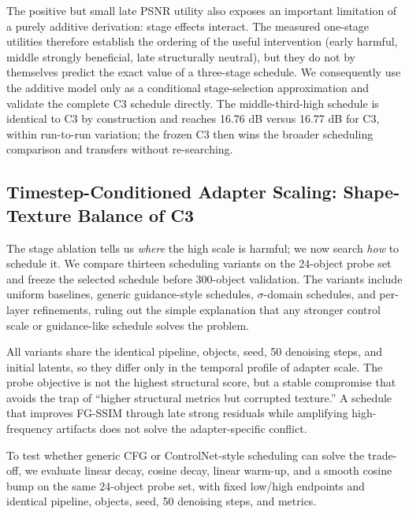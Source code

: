 \documentclass[times,twocolumn,final]{elsarticle}
\begin{document}
The positive but small late PSNR utility also exposes an important limitation of a purely additive derivation: stage effects interact. The measured one-stage utilities therefore establish the ordering of the useful intervention (early harmful, middle strongly beneficial, late structurally neutral), but they do not by themselves predict the exact value of a three-stage schedule. We consequently use the additive model only as a conditional stage-selection approximation and validate the complete C3 schedule directly. The middle-third-high schedule is identical to C3 by construction and reaches 16.76 dB versus 16.77 dB for C3, within run-to-run variation; the frozen C3 then wins the broader scheduling comparison and transfers without re-searching.

\subsection{Timestep-Conditioned Adapter Scaling: Shape-Texture Balance of C3}
\label{subsec:c3}

The stage ablation tells us \emph{where} the high scale is harmful; we now search \emph{how} to schedule it. We compare thirteen scheduling variants on the 24-object probe set and freeze the selected schedule before 300-object validation. The variants include uniform baselines, generic guidance-style schedules, $\sigma$-domain schedules, and per-layer refinements, ruling out the simple explanation that any stronger control scale or guidance-like schedule solves the problem.

All variants share the identical pipeline, objects, seed, 50 denoising steps, and initial latents, so they differ only in the temporal profile of adapter scale. The probe objective is not the highest structural score, but a stable compromise that avoids the trap of ``higher structural metrics but corrupted texture.'' A schedule that improves FG-SSIM through late strong residuals while amplifying high-frequency artifacts does not solve the adapter-specific conflict.

To test whether generic CFG or ControlNet-style scheduling can solve the trade-off, we evaluate linear decay, cosine decay, linear warm-up, and a smooth cosine bump on the same 24-object probe set, with fixed low/high endpoints and identical pipeline, objects, seed, 50 denoising steps, and metrics.
\end{document}
